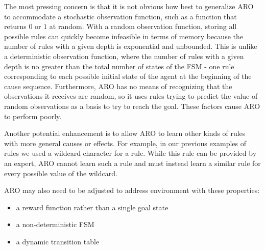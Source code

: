 \documentclass[letterpaper]{article} %
\begin{document}
The most pressing concern is that it is not obvious how best to generalize
ARO to accommodate a stochastic observation function, such as a function that returns $0$ or $1$ at random. With a random observation function, storing all possible rules can quickly become infeasible in terms of memory because the number of rules with a given depth is exponential and unbounded. This is unlike a deterministic observation function, where the number of rules with a given depth is no greater than the total number of states of the FSM - one rule corresponding to each possible initial state of the agent at the beginning of the cause sequence. Furthermore, ARO has no means of recognizing that the observations it receives are random, so it uses rules trying to predict the value of random observations as a basis to try to reach the goal. These factors cause ARO to perform poorly.

 Another potential enhancement is to allow ARO to learn other kinds of rules with more general causes or effects. For example, in our previous examples of rules we used a wildcard character for a rule. While this rule can be provided by an expert, ARO cannot learn such a rule and must instead learn a similar rule for every possible value of the wildcard.

ARO may also need to be adjusted to address environment with these
properties:
\begin{itemize}
\item a reward function rather than a single goal state
\item a non-deterministic FSM
\item a dynamic transition table
\end{itemize}

\begin{quote}
\begin{small}


\end{small}
\end{quote}
\end{document}

